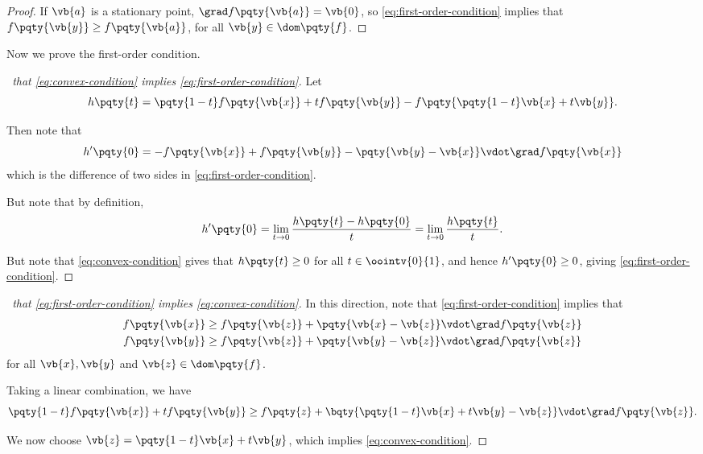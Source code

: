 \begin{proof}
    If \(\vb{a}\) is a stationary point, \(\grad f\pqty{\vb{a}} = \vb{0}\), so \eqref{eq:first-order-condition} implies that \(f\pqty{\vb{y}} \geq f\pqty{\vb{a}}\), for all \(\vb{y} \in \dom\pqty{f}\).
\end{proof}

Now we prove the first-order condition.

\begin{proof}[\proofname\ that \eqref{eq:convex-condition} implies \eqref{eq:first-order-condition}]
    Let
    \[
        h\pqty{t} = \pqty{1 - t} f\pqty{\vb{x}} + t f\pqty{\vb{y}} - f\pqty{\pqty{1 - t} \vb{x} + t \vb{y}}.
    \]

    Then note that
    \[
        h'\pqty{0} = - f\pqty{\vb{x}} + f\pqty{\vb{y}} - \pqty{\vb{y} - \vb{x}} \vdot \grad f\pqty{\vb{x}}
    \]
    which is the difference of two sides in \eqref{eq:first-order-condition}.

    But note that by definition,
    \[
        h'\pqty{0} = \lim_{t \to 0} \frac{h\pqty{t} - h\pqty{0}}{t} = \lim_{t \to 0} \frac{h\pqty{t}}{t}.
    \]

    But note that \eqref{eq:convex-condition} gives that \(h\pqty{t} \geq 0\) for all \(t \in \oointv{0}{1}\), and hence \(h'\pqty{0} \geq 0\), giving \eqref{eq:first-order-condition}.
 
\end{proof}

\begin{proof}[\proofname\ that \eqref{eq:first-order-condition} implies \eqref{eq:convex-condition}]
    In this direction, note that \eqref{eq:first-order-condition} implies that
    \begin{align*}
        f\pqty{\vb{x}} &\geq f\pqty{\vb{z}} + \pqty{\vb{x} - \vb{z}} \vdot \grad f\pqty{\vb{z}} \\
        f\pqty{\vb{y}} &\geq f\pqty{\vb{z}} + \pqty{\vb{y} - \vb{z}} \vdot \grad f\pqty{\vb{z}}
    \end{align*}
    for all \(\vb{x}, \vb{y}\) and \(\vb{z} \in \dom\pqty{f}\).

    Taking a linear combination, we have
    \[
        \pqty{1 - t} f\pqty{\vb{x}} + t f \pqty{\vb{y}} \geq f\pqty{z} + \bqty{\pqty{1 - t} \vb{x} + t \vb{y} - \vb{z}} \vdot \grad f\pqty{\vb{z}}.
    \]

    We now choose \(\vb{z} = \pqty{1 - t} \vb{x} + t \vb{y}\), which implies \eqref{eq:convex-condition}.
\end{proof}

